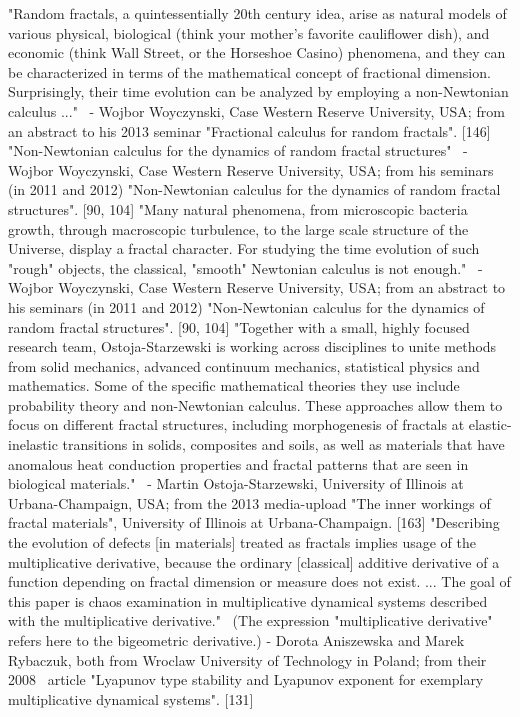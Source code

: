 \documentclass[12pt]{article}
\begin{document}
"Random fractals, a quintessentially 20th century idea, arise as natural models of various physical, biological (think your mother's favorite cauliflower dish), and economic (think Wall Street, or the Horseshoe Casino) phenomena, and they can be characterized in terms of the mathematical concept of fractional dimension. Surprisingly, their time evolution can be analyzed by employing a non-Newtonian calculus ..."  - Wojbor Woyczynski, Case Western Reserve University, USA; from an abstract to his 2013 seminar "Fractional calculus for random fractals". [146]
"Non-Newtonian calculus for the dynamics of random fractal structures"  - Wojbor Woyczynski, Case Western Reserve University, USA; from his seminars (in 2011 and 2012) "Non-Newtonian calculus for the dynamics of random fractal structures". [90, 104]
"Many natural phenomena, from microscopic bacteria growth, through macroscopic turbulence, to the large scale structure of the Universe, display a fractal character. For studying the time evolution of such "rough" objects, the classical, "smooth" Newtonian calculus is not enough."  - Wojbor Woyczynski, Case Western Reserve University, USA; from an abstract to his seminars (in 2011 and 2012) "Non-Newtonian calculus for the dynamics of random fractal structures". [90, 104]
"Together with a small, highly focused research team, Ostoja-Starzewski is working across disciplines to unite methods from solid mechanics, advanced continuum mechanics, statistical physics and mathematics. Some of the specific mathematical theories they use include probability theory and non-Newtonian calculus. These approaches allow them to focus on different fractal structures, including morphogenesis of fractals at elastic-inelastic transitions in solids, composites and soils, as well as materials that have anomalous heat conduction properties and fractal patterns that are seen in biological materials."  - Martin Ostoja-Starzewski, University of Illinois at Urbana-Champaign, USA; from the 2013 media-upload "The inner workings of fractal materials", University of Illinois at Urbana-Champaign. [163]
"Describing the evolution of defects [in materials] treated as fractals implies usage of the multiplicative derivative, because the ordinary [classical] additive derivative of a function depending on fractal dimension or measure does not exist. ... The goal of this paper is chaos examination in multiplicative dynamical systems described with the multiplicative derivative."  (The expression "multiplicative derivative" refers here to the bigeometric derivative.) - Dorota Aniszewska and Marek Rybaczuk, both from Wroclaw University of Technology in Poland; from their 2008  article "Lyapunov type stability and Lyapunov exponent for exemplary multiplicative dynamical systems". [131]
\end{document}

